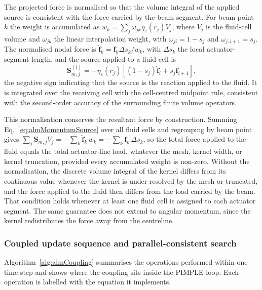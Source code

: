 \noindent
The projected force is normalised so that the volume integral of the applied source is consistent with the force carried by the beam segment. For beam point $k$ the weight is accumulated as $w_k = \sum_{j}\omega_{jk}\eta_{\varepsilon}(r_j)V_j$, where $V_j$ is the fluid-cell volume and $\omega_{jk}$ the linear interpolation weight, with $\omega_{ji}=1-s_j$ and $\omega_{j,i+1}=s_j$. The normalised nodal force is $\widehat{\mathbf{f}}_k = \mathbf{f}_k\Delta s_k / w_k$, with $\Delta s_k$ the local actuator-segment length, and the source applied to a fluid cell is
\begin{equation}
\mathbf{S}_{m,j}^{(i)}
=
-\eta_{\varepsilon}(r_j)
\left[
(1-s_j)\widehat{\mathbf{f}}_{i}
+
s_j\widehat{\mathbf{f}}_{i+1}
\right],
\label{eq:almMomentumSource}
\end{equation}
the negative sign indicating that the source is the reaction applied to the fluid. It is integrated over the receiving cell with the cell-centred midpoint rule, consistent with the second-order accuracy of the surrounding finite volume operators.

\noindent
This normalisation conserves the resultant force by construction. Summing Eq.~\eqref{eq:almMomentumSource} over all fluid cells and regrouping by beam point gives $\sum_{j}\mathbf{S}_{m,j}V_{j} = -\sum_{k}\widehat{\mathbf{f}}_{k}\,w_{k} = -\sum_{k}\mathbf{f}_{k}\,\Delta s_{k}$, so the total force applied to the fluid equals the total actuator-line load, whatever the mesh, kernel width, or kernel truncation, provided every accumulated weight is non-zero. Without the normalisation, the discrete volume integral of the kernel differs from its continuous value whenever the kernel is under-resolved by the mesh or truncated, and the force applied to the fluid then differs from the load carried by the beam. That condition holds whenever at least one fluid cell is assigned to each actuator segment. The same guarantee does not extend to angular momentum, since the kernel redistributes the force away from the centreline.

\subsubsection{Coupled update sequence and parallel-consistent search}
\label{sec:almParallelSearch}
Algorithm~\ref{alg:almCoupling} summarises the operations performed within one time step and shows where the coupling sits inside the PIMPLE loop. Each operation is labelled with the equation it implements.

